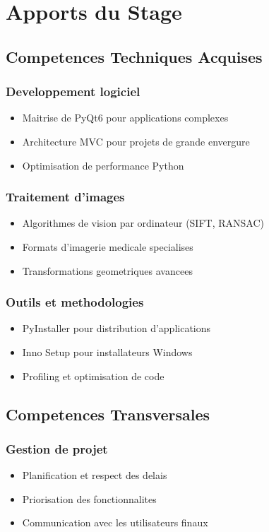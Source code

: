 \documentclass[12pt,a4paper]{article}
\begin{document}
\section{Apports du Stage}

\subsection{Competences Techniques Acquises}

\subsubsection{Developpement logiciel}
\begin{itemize}
\item Maitrise de PyQt6 pour applications complexes
\item Architecture MVC pour projets de grande envergure
\item Optimisation de performance Python
\end{itemize}

\subsubsection{Traitement d'images}
\begin{itemize}
\item Algorithmes de vision par ordinateur (SIFT, RANSAC)
\item Formats d'imagerie medicale specialises
\item Transformations geometriques avancees
\end{itemize}

\subsubsection{Outils et methodologies}
\begin{itemize}
\item PyInstaller pour distribution d'applications
\item Inno Setup pour installateurs Windows
\item Profiling et optimisation de code
\end{itemize}

\subsection{Competences Transversales}

\subsubsection{Gestion de projet}
\begin{itemize}
\item Planification et respect des delais
\item Priorisation des fonctionnalites
\item Communication avec les utilisateurs finaux
\end{itemize}
\end{document}
